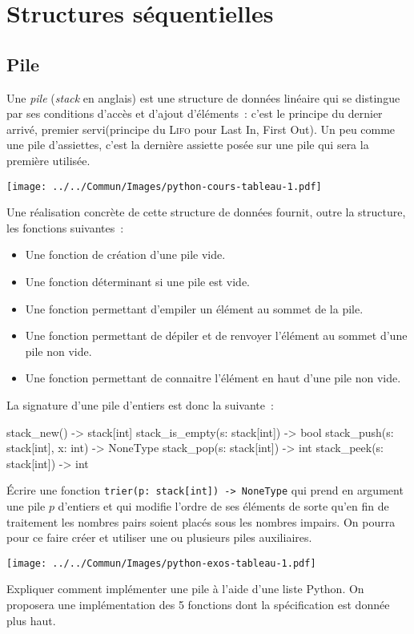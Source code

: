 \documentclass{magnolia}
\begin{document}
\section{Structures séquentielles}

\subsection{Pile}

Une \emph{pile} (\emph{stack} en anglais) est une structure de données linéaire qui se distingue par
ses conditions d'accès et d'ajout d'éléments~: c'est le principe du
\og dernier arrivé, premier servi\fg  (principe du \textsc{Lifo} pour Last In, First Out).
Un peu comme une pile d'assiettes, c'est la dernière assiette posée sur une pile
qui sera la première utilisée.

\begin{center}
\texttt{[image: ../../Commun/Images/python-cours-tableau-1.pdf]}
\end{center}

Une réalisation concrète de cette structure de données fournit, outre la structure, les
fonctions suivantes~:
\begin{itemize}
\item Une fonction de création d'une pile vide.
\item Une fonction déterminant si une pile est vide.
\item Une fonction permettant d'empiler un élément au sommet de la pile.
\item Une fonction permettant de dépiler et de renvoyer l'élément au sommet d'une pile
  non vide.
\item Une fonction permettant de connaitre l'élément en haut d'une pile non vide.
\end{itemize}
La signature d'une pile d'entiers est donc la suivante~:
\begin{pythoncodeline}
stack_new() -> stack[int]
stack_is_empty(s: stack[int]) -> bool
stack_push(s: stack[int], x: int) -> NoneType
stack_pop(s: stack[int]) -> int
stack_peek(s: stack[int]) -> int
\end{pythoncodeline}

\begin{exos}
\exo Écrire une fonction \verb!trier(p: stack[int]) -> NoneType! qui prend en argument une pile $p$
  d'entiers et qui modifie l'ordre de ses éléments de sorte qu'en fin de traitement les
  nombres pairs soient placés sous les nombres impairs. On pourra pour ce faire créer et
  utiliser une ou plusieurs piles auxiliaires.
\begin{center}
\texttt{[image: ../../Commun/Images/python-exos-tableau-1.pdf]}
\end{center}
\exo Expliquer comment implémenter une pile à l'aide d'une liste Python. On proposera une
  implémentation des 5 fonctions dont la spécification est donnée plus haut.
\end{exos}
\end{document}
